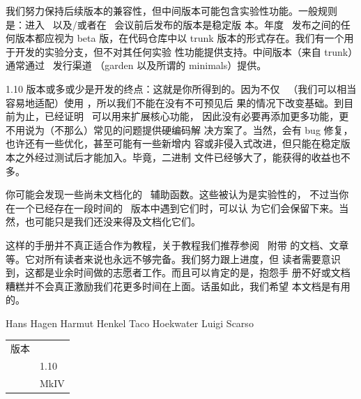 我们努力保持后续版本的兼容性，但中间版本可能包含实验性功能。一般规则
是：进入 \TEXLIVE\ 以及/或者在 \CONTEXT\ 会议前后发布的版本是稳定版
本。年度 \TEXLIVE\ 发布之间的任何版本都应视为 beta 版，在代码仓库中以
trunk 版本的形式存在。我们有一个用于开发的实验分支，但不对其任何实验
性功能提供支持。中间版本（来自 trunk）通常通过 \CONTEXT\ 发行渠道
（garden 以及所谓的 minimals）提供。

1.10 版本或多或少是开发的终点：这就是你所得到的。因为不仅 \CONTEXT\
（我们可以相当容易地适配）使用 \LUATEX{}，所以我们不能在没有不可预见后
果的情况下改变基础。到目前为止，已经证明 \LUA\ 可以用来扩展核心功能，
因此没有必要再添加更多功能，更不用说为（不那么）常见的问题提供硬编码解
决方案了。当然，会有 bug 修复，也许还有一些优化，甚至可能有一些新增内
容或非侵入式改进，但只能在稳定版本之外经过测试后才能加入。毕竟，二进制
文件已经够大了，能获得的收益也不多。

你可能会发现一些尚未文档化的 \LUA\ 辅助函数。这些被认为是实验性的，
不过当你在一个已经存在一段时间的 \CONTEXT\ 版本中遇到它们时，可以认
为它们会保留下来。当然，也可能只是我们还没来得及文档化它们。

这样的手册并不真正适合作为教程，关于教程我们推荐参阅 \CONTEXT\ 附带
的文档、文章等。它对所有读者来说也永远不够完备。我们努力跟上进度，但
读者需要意识到，这都是业余时间做的志愿者工作。而且可以肯定的是，抱怨手
册不好或文档糟糕并不会真正激励我们花更多时间在上面。话虽如此，我们希望
本文档是有用的。

\medskip


\begin{flushleft}
Hans Hagen
Harmut Henkel
Taco Hoekwater
Luigi Scarso
\end{flushleft}

\medskip

\begin{longtable}{l l}
版本     & \currentdate \\
\LUATEX  & 1.10 \\
\CONTEXT & MkIV \\
\end{longtable}
